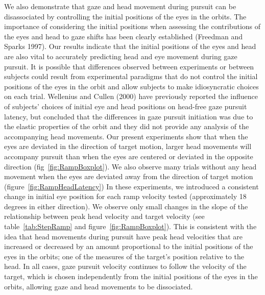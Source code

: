 \documentclass[12pt]{article}
\begin{document}
We also demonstrate that gaze and head movement during pursuit can be disassociated by controlling the initial positions of the eyes in the orbits. The importance of considering the initial positions when assessing the contributions of the eyes and head to gaze shifts has been clearly established (Freedman and Sparks 1997).  Our results indicate that the initial positions of the eyes and head are also vital to accurately predicting head and eye movement during gaze pursuit. It is possible that differences observed between experiments or between subjects could result from experimental paradigms that do not control the initial positions of the eyes in the orbit and allow subjects to make idiosyncratic choices on each trial. Wellenius and Cullen (2000) have previously reported the influence of subjects' choices of initial eye and head positions on head-free gaze pursuit latency, but concluded that the differences in gaze pursuit initiation was due to the elastic properties of the orbit and they did not provide any analysis of the accompanying head movements. Our present experiments show that when the eyes are deviated in the direction of target motion, larger head movements will accompany pursuit than when the eyes are centered or deviated in the opposite direction (fig~\ref{fig:RampBoxplot}). We also observe many trials without any head movement when the eyes are deviated away from the direction of target motion (figure~\ref{fig:RampHeadLatency})  In these experiments, we introduced a consistent change in initial eye position for each ramp velocity tested (approximately 18 degrees in either direction). We observe only small changes in the slope of the relationship between peak head velocity and target velocity (see table~\ref{tab:StepRamp} and figure~\ref{fig:RampBoxplot}). This is consistent with the idea that head movements during pursuit have peak head velocities that are increased or decreased by an amount proportional to the initial positions of the eyes in the orbits; one of the measures of the target’s position relative to the head. In all cases, gaze pursuit velocity continues to follow the velocity of the target, which is chosen independently from the initial positions of the eyes in the orbits, allowing gaze and head movements to be dissociated. 
\end{document}
